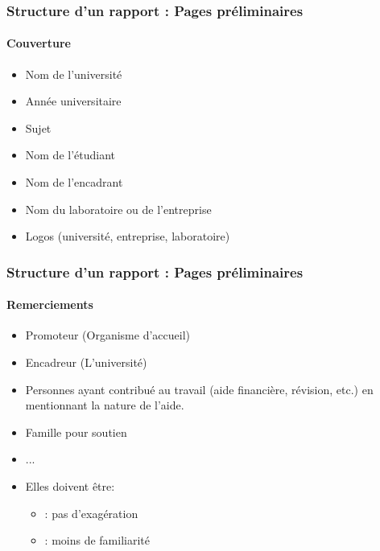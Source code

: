\documentclass[xcolor=table]{beamer}
\begin{document}
\begin{frame}
\frametitle{Structure d'un rapport : Pages préliminaires}
\framesubtitle{Couverture}

\begin{minipage}{0.60\textwidth}
	\begin{itemize}
		\item Nom de l'université 
		\item Année universitaire
		\item Sujet
		\item Nom de l'étudiant
		\item Nom de l'encadrant 
		\item Nom du laboratoire ou de l'entreprise
		\item Logos (université, entreprise, laboratoire)
	\end{itemize}
\end{minipage}
\begin{minipage}{0.38\textwidth}
\end{minipage}

\end{frame}

\begin{frame}
\frametitle{Structure d'un rapport : Pages préliminaires}
\framesubtitle{Remerciements}

\begin{minipage}{0.60\textwidth}
	\begin{itemize}
		\item Promoteur (Organisme d'accueil)
		\item Encadreur (L'université)
		\item Personnes ayant contribué au travail (aide financière, révision, etc.) en mentionnant la nature de l'aide.
		\item Famille pour soutien
		\item ...
		\item Elles doivent être:
		\begin{itemize}
			\item {}: pas d'exagération
			\item {}: moins de familiarité
		\end{itemize}
	\end{itemize}
\end{minipage}
\begin{minipage}{0.38\textwidth}
\end{minipage}

\end{frame}
\end{document}
